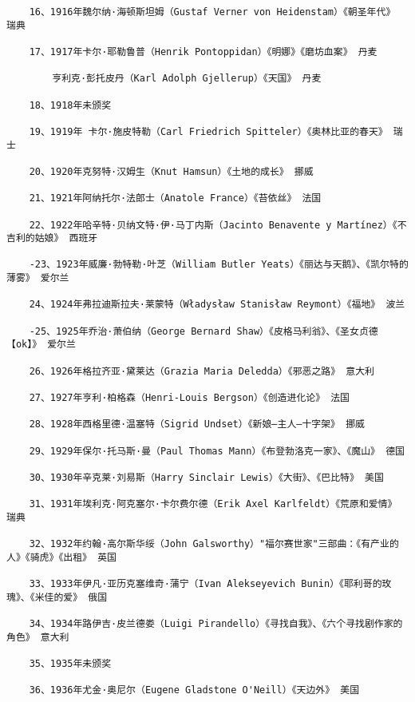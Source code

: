 \documentclass[UTF8]{../RepresentationUniverse}
\begin{document}
\begin{lstlisting}
    16、1916年魏尔纳·海顿斯坦姆（Gustaf Verner von Heidenstam）《朝圣年代》 瑞典
    
    17、1917年卡尔·耶勒鲁普（Henrik Pontoppidan）《明娜》《磨坊血案》 丹麦
    
        亨利克·彭托皮丹（Karl Adolph Gjellerup）《天国》 丹麦
    
    18、1918年未颁奖
    
    19、1919年 卡尔·施皮特勒（Carl Friedrich Spitteler）《奥林比亚的春天》 瑞士
    
    20、1920年克努特·汉姆生（Knut Hamsun）《土地的成长》 挪威
    
    21、1921年阿纳托尔·法郎士（Anatole France）《苔依丝》 法国
    
    22、1922年哈辛特·贝纳文特·伊·马丁内斯（Jacinto Benavente y Martínez）《不吉利的姑娘》 西班牙
    
    -23、1923年威廉·勃特勒·叶芝（William Butler Yeats）《丽达与天鹅》、《凯尔特的薄雾》 爱尔兰
    
    24、1924年弗拉迪斯拉夫·莱蒙特（Władysław Stanisław Reymont）《福地》 波兰
    
    -25、1925年乔治·萧伯纳（George Bernard Shaw）《皮格马利翁》、《圣女贞德【ok】》 爱尔兰
    
    26、1926年格拉齐亚·黛莱达（Grazia Maria Deledda）《邪恶之路》 意大利
    
    27、1927年亨利·柏格森（Henri-Louis Bergson）《创造进化论》 法国
    
    28、1928年西格里德·温塞特（Sigrid Undset）《新娘—主人—十字架》 挪威
    
    29、1929年保尔·托马斯·曼（Paul Thomas Mann）《布登勃洛克一家》、《魔山》 德国
    
    30、1930年辛克莱·刘易斯（Harry Sinclair Lewis）《大街》、《巴比特》 美国
    
    31、1931年埃利克·阿克塞尔·卡尔费尔德（Erik Axel Karlfeldt）《荒原和爱情》 瑞典
    
    32、1932年约翰·高尔斯华绥（John Galsworthy）"福尔赛世家"三部曲：《有产业的人》《骑虎》《出租》 英国
    
    33、1933年伊凡·亚历克塞维奇·蒲宁（Ivan Alekseyevich Bunin）《耶利哥的玫瑰》、《米佳的爱》 俄国
    
    34、1934年路伊吉·皮兰德娄（Luigi Pirandello）《寻找自我》、《六个寻找剧作家的角色》 意大利
    
    35、1935年未颁奖
    
    36、1936年尤金·奥尼尔（Eugene Gladstone O'Neill）《天边外》 美国
    

\end{lstlisting}
\end{document}
